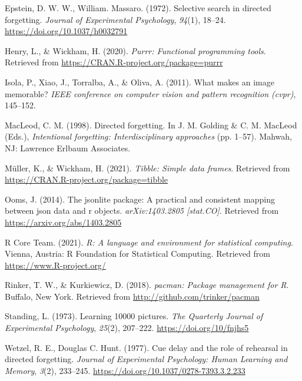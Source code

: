\documentclass[
  english,
  man,floatsintext]{apa6}
\begin{document}
\leavevmode\hypertarget{ref-EpsteinW1972}{}%
Epstein, D. W. W., William. Massaro. (1972). Selective search in directed forgetting. \emph{Journal of Experimental Psychology}, \emph{94}(1), 18--24. \url{https://doi.org/10.1037/h0032791}

\leavevmode\hypertarget{ref-R-purrr}{}%
Henry, L., \& Wickham, H. (2020). \emph{Purrr: Functional programming tools}. Retrieved from \url{https://CRAN.R-project.org/package=purrr}

\leavevmode\hypertarget{ref-Isola2011}{}%
Isola, P., Xiao, J., Torralba, A., \& Oliva, A. (2011). What makes an image memorable? \emph{IEEE conference on computer vision and pattern recognition (cvpr)}, 145--152.

\leavevmode\hypertarget{ref-macleodDirectedForgetting1998}{}%
MacLeod, C. M. (1998). Directed forgetting. In J. M. Golding \& C. M. MacLeod (Eds.), \emph{Intentional forgetting: Interdisciplinary approaches} (pp. 1--57). Mahwah, NJ: Lawrence Erlbaum Associates.

\leavevmode\hypertarget{ref-R-tibble}{}%
Müller, K., \& Wickham, H. (2021). \emph{Tibble: Simple data frames}. Retrieved from \url{https://CRAN.R-project.org/package=tibble}

\leavevmode\hypertarget{ref-R-jsonlite}{}%
Ooms, J. (2014). The jsonlite package: A practical and consistent mapping between json data and r objects. \emph{arXiv:1403.2805 {[}stat.CO{]}}. Retrieved from \url{https://arxiv.org/abs/1403.2805}

\leavevmode\hypertarget{ref-R-base}{}%
R Core Team. (2021). \emph{R: A language and environment for statistical computing}. Vienna, Austria: R Foundation for Statistical Computing. Retrieved from \url{https://www.R-project.org/}

\leavevmode\hypertarget{ref-R-pacman}{}%
Rinker, T. W., \& Kurkiewicz, D. (2018). \emph{pacman: Package management for R}. Buffalo, New York. Retrieved from \url{http://github.com/trinker/pacman}

\leavevmode\hypertarget{ref-standingLearning10000Pictures1973}{}%
Standing, L. (1973). Learning 10000 pictures. \emph{The Quarterly Journal of Experimental Psychology}, \emph{25}(2), 207--222. \url{https://doi.org/10/fnjhs5}

\leavevmode\hypertarget{ref-WetzelC1977}{}%
Wetzel, R. E., Douglas C. Hunt. (1977). Cue delay and the role of rehearsal in directed forgetting. \emph{Journal of Experimental Psychology: Human Learning and Memory}, \emph{3}(2), 233--245. \url{https://doi.org/10.1037/0278-7393.3.2.233}
\end{document}

